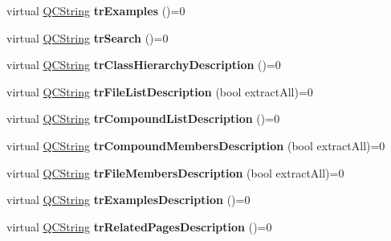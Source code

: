 \begin{DoxyCompactItemize}
\item 
\hypertarget{class_translator_a1748447d1cc9eaa2e6eeab39912e1a81}{virtual \hyperlink{class_q_c_string}{Q\-C\-String} {\bfseries tr\-Examples} ()=0}\label{class_translator_a1748447d1cc9eaa2e6eeab39912e1a81}

\item 
\hypertarget{class_translator_a93777092b9192f293423c567de5d42e2}{virtual \hyperlink{class_q_c_string}{Q\-C\-String} {\bfseries tr\-Search} ()=0}\label{class_translator_a93777092b9192f293423c567de5d42e2}

\item 
\hypertarget{class_translator_ad89d23797e10d645c75053b0ef82ad22}{virtual \hyperlink{class_q_c_string}{Q\-C\-String} {\bfseries tr\-Class\-Hierarchy\-Description} ()=0}\label{class_translator_ad89d23797e10d645c75053b0ef82ad22}

\item 
\hypertarget{class_translator_a86f09d8de1eece65b42d78785080629f}{virtual \hyperlink{class_q_c_string}{Q\-C\-String} {\bfseries tr\-File\-List\-Description} (bool extract\-All)=0}\label{class_translator_a86f09d8de1eece65b42d78785080629f}

\item 
\hypertarget{class_translator_a4461ae784d9f8208a1b71a1bb145a9d2}{virtual \hyperlink{class_q_c_string}{Q\-C\-String} {\bfseries tr\-Compound\-List\-Description} ()=0}\label{class_translator_a4461ae784d9f8208a1b71a1bb145a9d2}

\item 
\hypertarget{class_translator_aaab7890f117f5432be872c1d0de0ee5d}{virtual \hyperlink{class_q_c_string}{Q\-C\-String} {\bfseries tr\-Compound\-Members\-Description} (bool extract\-All)=0}\label{class_translator_aaab7890f117f5432be872c1d0de0ee5d}

\item 
\hypertarget{class_translator_af02a708ef3a3261fbaae8a4a76d571c0}{virtual \hyperlink{class_q_c_string}{Q\-C\-String} {\bfseries tr\-File\-Members\-Description} (bool extract\-All)=0}\label{class_translator_af02a708ef3a3261fbaae8a4a76d571c0}

\item 
\hypertarget{class_translator_ab92565a48f6206a939c9aa89e36b9f88}{virtual \hyperlink{class_q_c_string}{Q\-C\-String} {\bfseries tr\-Examples\-Description} ()=0}\label{class_translator_ab92565a48f6206a939c9aa89e36b9f88}

\item 
\hypertarget{class_translator_a4e865c8e6194005457dd1d7150e2dd53}{virtual \hyperlink{class_q_c_string}{Q\-C\-String} {\bfseries tr\-Related\-Pages\-Description} ()=0}\label{class_translator_a4e865c8e6194005457dd1d7150e2dd53}


\end{DoxyCompactItemize}

